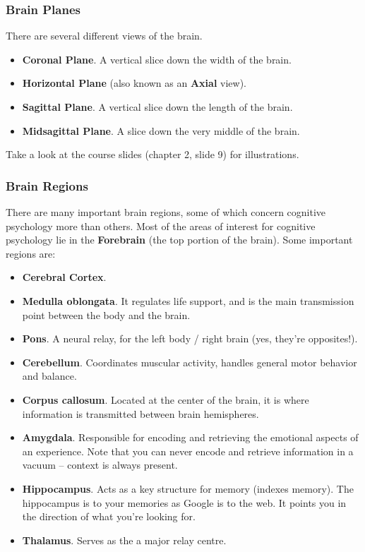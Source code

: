 \documentclass[]{article}
\begin{document}
			\subsubsection{Brain Planes}
				There are several different views of the brain.
				\begin{itemize}
					\item \textbf{Coronal Plane}. A vertical slice down the width of the brain.
					\item \textbf{Horizontal Plane} (also known as an \textbf{Axial} view).
					\item \textbf{Sagittal Plane}. A vertical slice down the length of the brain.
					\item \textbf{Midsagittal Plane}. A slice down the very middle of the brain.
				\end{itemize}
				Take a look at the course slides (chapter 2, slide 9) for illustrations.
			\subsubsection{Brain Regions}
			There are many important brain regions, some of which concern cognitive psychology more than others. Most of the areas of interest for cognitive psychology lie in the \textbf{Forebrain} (the top portion of the brain). Some important regions are:
				\begin{itemize}
					\item \textbf{Cerebral Cortex}.
					\item \textbf{Medulla oblongata}.  It regulates life support, and is the main transmission point between the body and the brain.
					\item \textbf{Pons}. A neural relay, for the left body / right brain (yes, they're opposites!).
					\item \textbf{Cerebellum}. Coordinates muscular activity, handles general motor behavior and balance.
					\item \textbf{Corpus callosum}. Located at the center of the brain, it is where information is transmitted between brain hemispheres.
					\item \textbf{Amygdala}. Responsible for encoding and retrieving the emotional aspects of an experience. Note that you can never encode and retrieve information in a vacuum -- context is always present.
					\item \textbf{Hippocampus}. Acts as a key structure for memory (indexes memory). The hippocampus is to your memories as Google is to the web. It points you in the direction of what you're looking for.
					\item \textbf{Thalamus}. Serves as the a major relay centre.
				\end{itemize}
\end{document}
